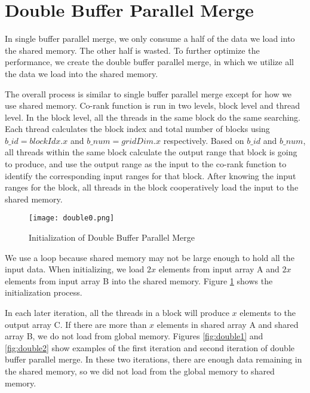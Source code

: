     \section{Double Buffer Parallel Merge}\label{sect:double}
    In single buffer parallel merge, we only consume a half of the data we load into the shared 
    memory. The other half is wasted. To further 
    optimize the performance, we create the double buffer parallel merge, in which we 
    utilize all the data we load into the shared memory.

    The overall process is similar to single buffer parallel merge except for how we use
    shared memory. Co-rank function is
    run in two levels, block level and thread level. In the block level, all the threads in 
    the same block do the same searching. Each thread calculates the block index and total 
    number of blocks using $b\_id = blockIdx.x$ and $b\_num = gridDim.x$ respectively. 
    Based on $b\_id$ and $b\_num$, all threads within the same block calculate the output range 
    that block is going to produce, and use the output range as the input to the co-rank function 
    to identify the corresponding input ranges for that block. 
    After knowing the input ranges for the block, all threads in the block cooperatively load the 
    input to the shared memory.

    \begin{figure}[!h]
    \begin{center}
    \texttt{[image: double0.png]}
    \end{center}
    \caption{{\label{fig:double0}} Initialization of Double Buffer Parallel Merge}
    \end{figure}    

    We use a loop because shared memory may not be large enough to hold all the input data.
    When initializing, we load $2x$ elements from input array A and $2x$ elements from input 
    array B into the shared memory. Figure \ref{fig:double0} shows the initialization process.

    In each later iteration, all the threads in a block will produce $x$
    elements to the output array C. If there are more than $x$ elements in shared array A and 
    shared array B, we do not load from global memory. Figures \ref{fig:double1} and \ref{fig:double2} 
    show examples of the first iteration and second iteration of double buffer parallel 
    merge. In these two iterations, there are enough data remaining in the shared memory, 
    so we did not load from the global memory to shared memory.

